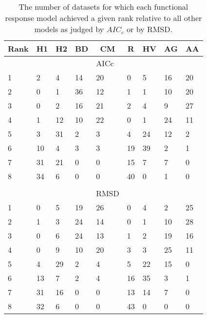 \begin{table}[!tbp]
\caption{The number of datasets for which each functional response model achieved a given rank relative to all other models as judged by $AIC_c$ or by RMSD.\label{table:AICc_and_RMSD_rankings}} 
\begin{center}
\begin{tabular}{lllllllll}
\hline\hline
\multicolumn{1}{l}{Rank}&\multicolumn{1}{c}{H1}&\multicolumn{1}{c}{H2}&\multicolumn{1}{c}{BD}&\multicolumn{1}{c}{CM}&\multicolumn{1}{c}{R}&\multicolumn{1}{c}{HV}&\multicolumn{1}{c}{AG}&\multicolumn{1}{c}{AA}\tabularnewline
\hline
&&&&AICc&&&&\tabularnewline
1&2&4&14&20&0&5&16&20\tabularnewline
2&0&1&36&12&1&1&10&20\tabularnewline
3&0&2&16&21&2&4&9&27\tabularnewline
4&1&12&10&22&0&1&24&11\tabularnewline
5&3&31&2&3&4&24&12&2\tabularnewline
6&10&4&3&3&19&39&2&1\tabularnewline
7&31&21&0&0&15&7&7&0\tabularnewline
8&34&6&0&0&40&0&1&0\tabularnewline
&&&&&&&&\tabularnewline
&&&&RMSD&&&&\tabularnewline
1&0&5&19&26&0&4&2&25\tabularnewline
2&1&3&24&14&0&1&10&28\tabularnewline
3&0&6&24&13&1&2&19&16\tabularnewline
4&0&9&10&20&3&3&25&11\tabularnewline
5&4&29&2&4&5&22&15&0\tabularnewline
6&13&7&2&4&16&35&3&1\tabularnewline
7&31&16&0&0&13&14&7&0\tabularnewline
8&32&6&0&0&43&0&0&0\tabularnewline
\hline
\end{tabular}\end{center}
\end{table}
